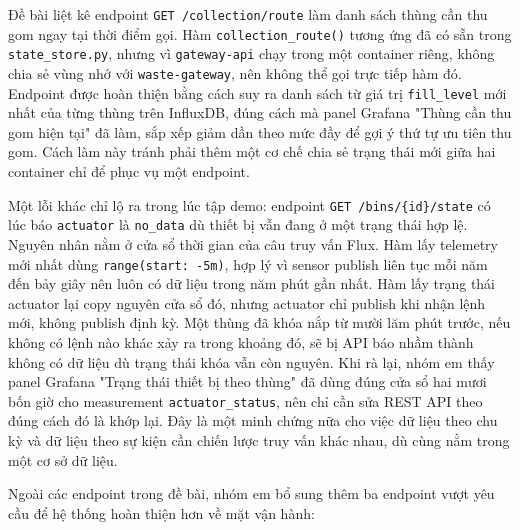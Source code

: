 \documentclass[12pt,a4paper]{article}
\begin{document}
Đề bài liệt kê endpoint \texttt{GET /collection/route} làm danh sách thùng cần thu gom ngay tại thời điểm gọi. Hàm \texttt{collection\_route()} tương ứng đã có sẵn trong \texttt{state\_store.py}, nhưng vì \texttt{gateway-api} chạy trong một container riêng, không chia sẻ vùng nhớ với \texttt{waste-gateway}, nên không thể gọi trực tiếp hàm đó. Endpoint được hoàn thiện bằng cách suy ra danh sách từ giá trị \texttt{fill\_level} mới nhất của từng thùng trên InfluxDB, đúng cách mà panel Grafana "Thùng cần thu gom hiện tại" đã làm, sắp xếp giảm dần theo mức đầy để gợi ý thứ tự ưu tiên thu gom. Cách làm này tránh phải thêm một cơ chế chia sẻ trạng thái mới giữa hai container chỉ để phục vụ một endpoint.

Một lỗi khác chỉ lộ ra trong lúc tập demo: endpoint \texttt{GET /bins/\{id\}/state} có lúc báo \texttt{actuator} là \texttt{no\_data} dù thiết bị vẫn đang ở một trạng thái hợp lệ. Nguyên nhân nằm ở cửa sổ thời gian của câu truy vấn Flux. Hàm lấy telemetry mới nhất dùng \texttt{range(start: -5m)}, hợp lý vì sensor publish liên tục mỗi năm đến bảy giây nên luôn có dữ liệu trong năm phút gần nhất. Hàm lấy trạng thái actuator lại copy nguyên cửa sổ đó, nhưng actuator chỉ publish khi nhận lệnh mới, không publish định kỳ. Một thùng đã khóa nắp từ mười lăm phút trước, nếu không có lệnh nào khác xảy ra trong khoảng đó, sẽ bị API báo nhầm thành không có dữ liệu dù trạng thái khóa vẫn còn nguyên. Khi rà lại, nhóm em thấy panel Grafana "Trạng thái thiết bị theo thùng" đã dùng đúng cửa sổ hai mươi bốn giờ cho measurement \texttt{actuator\_status}, nên chỉ cần sửa REST API theo đúng cách đó là khớp lại. Đây là một minh chứng nữa cho việc dữ liệu theo chu kỳ và dữ liệu theo sự kiện cần chiến lược truy vấn khác nhau, dù cùng nằm trong một cơ sở dữ liệu.

Ngoài các endpoint trong đề bài, nhóm em bổ sung thêm ba endpoint vượt yêu cầu để hệ thống hoàn thiện hơn về mặt vận hành:
\end{document}
